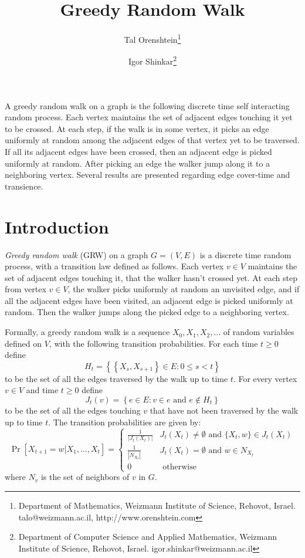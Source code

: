 \documentclass[12pt,a4paper]{article}
\newcommand{\set}[1]{{\left\{#1 \right\}}}
\newcommand{\0}{{\bf 0}}
\begin{document}
\title{\bf Greedy Random Walk}
\author{Tal Orenshtein\thanks{\scriptsize{Department of Mathematics, Weizmann Institute of Science, Rehovot, Israel. talo@weizmann.ac.il, http://www.orenshtein.com}} \and Igor Shinkar\thanks{\scriptsize{Department of Computer Science and Applied Mathematics, Weizmann Institute of Science, Rehovot, Israel. igor.shinkar@weizmann.ac.il}}}

\date{}
\maketitle

\abstract
A greedy random walk on a graph is the following discrete time self interacting random process.
Each vertex maintains the set of adjacent edges touching it yet to be crossed.
At each step, if the walk is in some vertex, it picks an edge uniformly at random among the adjacent edges of that vertex yet to be traversed. If all its adjacent edges have been crossed, then an adjacent edge is picked uniformly at random. After picking an edge the walker jump along it to a neighboring vertex. Several results are presented
regarding edge cover-time and transience.

\section{Introduction}\label{sec:intro}

{\it Greedy random walk} (GRW) on a graph $G=(V,E)$ is a discrete time random process, with a transition law defined as follows.
Each vertex $v \in V$ maintains the set of adjacent edges touching it, that the walker hasn't crossed yet.
At each step from vertex $v \in V$, the walker picks uniformly at random an unvisited edge,
and if all the adjacent edges have been visited, an adjacent edge is picked uniformly at random.
Then the walker jumps along the picked edge to a neighboring vertex.
\medskip

Formally, a greedy random walk is a sequence $X_0,X_1,X_2, \dots$ of random variables defined on $V$, with the following transition probabilities.
For each time $t \geq 0$ define
\[
    H_t = \set{\set{X_{s},X_{s+1}} \in E : 0 \leq s < t}
\]
to be the set of all the edges traversed by the walk up to time $t$.
For every vertex $v \in V$ and time $t \geq 0$ define
\[
    J_t(v) = \set{e \in E : v \in e \text{ and } e \notin H_t}
\]
to be the set of all the edges touching $v$ that have not been traversed by the walk up to time $t$.
The transition probabilities are given by:
\[
    \Pr[X_{t+1} = w | X_1, \dots, X_t] =
        \begin{cases}
            \frac{1}{|J_t(X_t)|}    &  J_t(X_t) \neq \emptyset \text{ and } \{X_t,w\} \in J_t(X_t) \\
            \frac{1}{|N_{X_t}|}     &  J_t(X_t) = \emptyset \text{ and } w \in N_{X_t} \\
            0                       &  \text{ otherwise }
        \end{cases}
\]
where $N_v$ is the set of neighbors of $v$ in $G$.
\medskip
\end{document}
